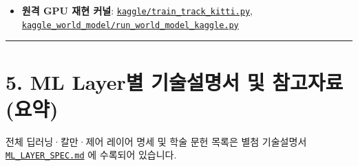 \documentclass[10.5pt,a4paper]{article}
\begin{document}
\begin{itemize}[leftmargin=1.5em,itemsep=2pt]
\begin{itemize}[leftmargin=1.5em,itemsep=2pt]
\item Test 시퀀스 \texttt{0019} (8초 단계별 / 105.9초 전체): \href{https://github.com/Heisnotanimposter/Totalcare\_autonomous\_driving\_Yolov5/blob/main/results/v3\_bev\_fixed/world\_outputs/world\_model\_0019\_staged/world\_model\_demo\_0019.mp4}{\texttt{staged MP4}} / \href{https://github.com/Heisnotanimposter/Totalcare\_autonomous\_driving\_Yolov5/blob/main/results/v3\_bev\_fixed/world\_outputs/world\_model\_0019\_full/world\_model\_demo\_0019.mp4}{\texttt{full MP4}}
\end{itemize}
\item \textbf{원격 GPU 재현 커널}: \href{https://github.com/Heisnotanimposter/Totalcare\_autonomous\_driving\_Yolov5/blob/main/kaggle/train\_track\_kitti.py}{\texttt{kaggle/\allowbreak{}train\_\allowbreak{}track\_\allowbreak{}kitti.\allowbreak{}py}}, \href{https://github.com/Heisnotanimposter/Totalcare\_autonomous\_driving\_Yolov5/blob/main/kaggle\_world\_model/run\_world\_model\_kaggle.py}{\texttt{kaggle\_\allowbreak{}world\_\allowbreak{}model/\allowbreak{}run\_\allowbreak{}world\_\allowbreak{}model\_\allowbreak{}kaggle.\allowbreak{}py}}
\end{itemize}

\par\noindent\rule{\textwidth}{0.4pt}\par\medskip

\section{5. ML Layer별 기술설명서 및 참고자료 (요약)}

전체 딥러닝·칼만·제어 레이어 명세 및 학술 문헌 목록은 별첨 기술설명서 \href{https://github.com/Heisnotanimposter/Totalcare\_autonomous\_driving\_Yolov5/blob/main/ML\_LAYER\_SPEC.md}{\texttt{ML\_\allowbreak{}LAYER\_\allowbreak{}SPEC.\allowbreak{}md}} 에 수록되어 있습니다.
\end{document}
